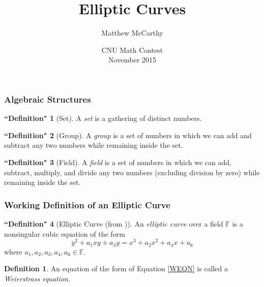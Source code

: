 \documentclass[xcolor=pdftex,dvipsnames,table]{beamer}
\theoremstyle{plain}
\theoremstyle{definition}
\newtheorem{defn}{Definition}
\newtheorem{defns}{``Definition"}
\def\FF{\mathbb{F}}
\begin{document}
\title[Elliptic Curves] %
{Elliptic Curves}
\author[McCarthy] %
{Matthew McCarthy}
\date[11/14/15] %
{CNU Math Contest\\ November 2015}


\frame{\titlepage}

\begin{frame}
	\frametitle{Algebraic Structures}

	\begin{defns}[Set]
		A \textit{set} is a gathering of distinct numbers.
	\end{defns}
	\begin{defns}[Group]
		A \textit{group} is a set of numbers in which we can add and subtract any two numbers while remaining inside the set.
	\end{defns}
	\begin{defns}[Field]
		A \textit{field} is a set of numbers in which we can add, subtract, multiply, and divide any two numbers (excluding division by zero) while remaining inside the set.
	\end{defns}
\end{frame}

\begin{frame}
	\frametitle{Working Definition of an Elliptic Curve}

	\begin{defns}[Elliptic Curve (from \cite{AEC})]
		An \textit{elliptic curve} over a field $\FF$ is a nonsingular cubic equation of the form
		\begin{equation}\label{WEQN}
		y^2+a_1xy+a_3y=x^3+a_2x^2+a_4x+a_6
		\end{equation}
		where $a_1,a_2,a_3,a_4,a_6\in\FF$.
	\end{defns}
	\begin{defn}
		An equation of the form of Equation \autoref{WEQN} is called a \textit{Weierstrass equation}.
	\end{defn}
\end{frame}
\end{document}
